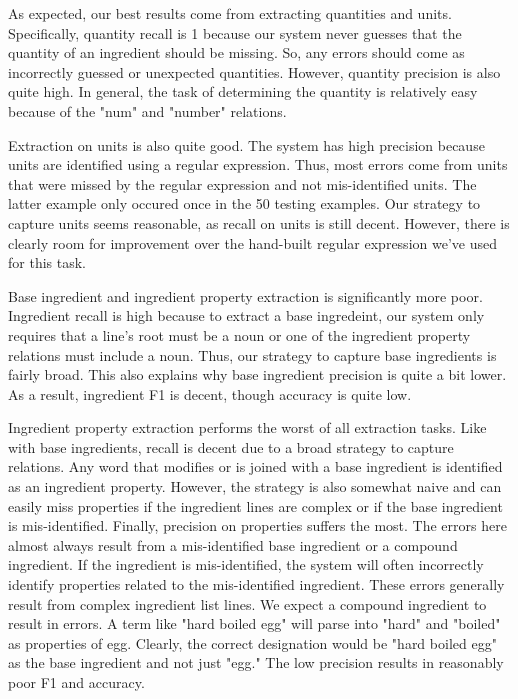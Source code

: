 \documentclass[11pt]{article}
\begin{document}
As expected, our best results come from extracting quantities and units. Specifically, quantity recall is 1 because our system never guesses that the quantity of an ingredient should be missing. So, any errors should come as incorrectly guessed or unexpected quantities. However, quantity precision is also quite high. In general, the task of determining the quantity is relatively easy because of the "num" and "number" relations. 

Extraction on units is also quite good. The system has high precision because units are identified using a regular expression. Thus, most errors come from units that were missed by the regular expression and not mis-identified units. The latter example only occured once in the 50 testing examples. Our strategy to capture units seems reasonable, as recall on units is still decent. However, there is clearly room for improvement over the hand-built regular expression we've used for this task. 

Base ingredient and ingredient property extraction is significantly more poor. Ingredient recall is high because to extract a base ingredeint, our system only requires that a line's root must be a noun or one of the ingredient property relations must include a noun. Thus, our strategy to capture base ingredients is fairly broad. This also explains why base ingredient precision is quite a bit lower. As a result, ingredient F1 is decent, though accuracy is quite low.

Ingredient property extraction performs the worst of all extraction tasks. Like with base ingredients, recall is decent due to a broad strategy to capture relations. Any word that modifies or is joined with a base ingredient is identified as an ingredient property. However, the strategy is also somewhat naive and can easily miss properties if the ingredient lines are complex or if the base ingredient is mis-identified. Finally, precision on properties suffers the most. The errors here almost always result from a mis-identified base ingredient or a compound ingredient. If the ingredient is mis-identified, the system will often incorrectly identify properties related to the mis-identified ingredient. These errors generally result from complex ingredient list lines. We expect a compound ingredient to result in errors. A term like "hard boiled egg" will parse into "hard" and "boiled" as properties of egg. Clearly, the correct designation would be "hard boiled egg" as the base ingredient and not just "egg." The low precision results in reasonably poor F1 and accuracy. 
\end{document}
